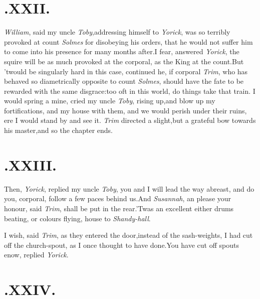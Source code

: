 \documentclass{article}
\begin{document}
\section{.\enspace  XXII.}

 \textit{William}, said my uncle
\textit{Toby},\break addressing himself to \textit{Yorick}, was so
terribly provoked at count \textit{Solmes} for disobeying his orders,
that he would not suffer him to come into his presence
for many months after.\tsh I fear,
answered \textit{Yorick}, the squire will be as\break 
much provoked at the corporal, as the
King at the count.\tsh But ’twould be\break
singularly hard in this case, continued
he, if corporal \textit{Trim}, who has behaved 
so diametrically opposite to count \textit{Solmes}, 
should have the fate to be rewarded with 
the same disgrace:\tsh too oft in this 
world, do things take that train.\tsh\break 
I would spring a mine, cried my uncle
\textit{Toby}, rising up,\tsh and blow up my 
fortifications, and my house with them,
and we would perish under their ruins,
ere I would stand by and see it.\tsh
\textit{Trim} directed a slight,\tsh but a
grate\-ful bow towards his master,\tsh and so
the chapter ends.  \vfill
{} \newpage


\section{.\enspace  XXIII.}

\quad\tsh Then, \textit{Yorick}, replied my uncle\break
\textit{Toby}, you and I will lead the way abreast,\break
\tsh and do you, corporal, follow a few paces behind us.\tsh And
\textit{Susannah}, an please your honour, said \textit{Trim}, shall be
put in the rear.\tsh ’Twas an excellent
either drums beating, or colours flying, 
house to \textit{Shandy-hall}.


\tsh  I wish, said \textit{Trim}, as they entered the
door,\tsk instead of the sash-weights, I had cut off the 
church-spout, as I once thought to have
done.\tsk You have cut\break
off spouts enow, replied \textit{Yorick}.\tsh

\section{.\enspace  XXIV.}
\end{document}
